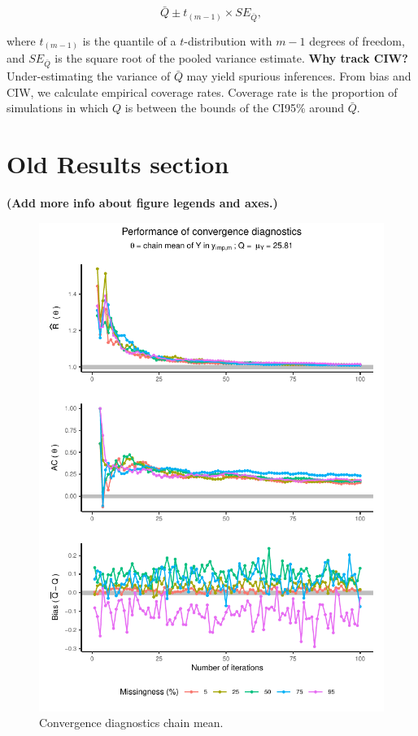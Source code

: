 \documentclass[Royal,times,sageh]{sagej}
\begin{document}
\[\bar{Q} \pm t_{(m-1)} \times SE_{\bar{Q}},\]

where \(t_{(m-1)}\) is the quantile of a \(t\)-distribution with \(m-1\)
degrees of freedom, and \(SE_{\bar{Q}}\) is the square root of the
pooled variance estimate. \textbf{Why track CIW?} Under-estimating the
variance of \(\bar{Q}\) may yield spurious inferences. From bias and
CIW, we calculate empirical coverage rates. Coverage rate is the
proportion of simulations in which \(Q\) is between the bounds of the
CI95\% around \(\bar{Q}\).

\hypertarget{old-results-section}{%
\section{Old Results section}\label{old-results-section}}

\textbf{(Add more info about figure legends and axes.)}

\begin{figure}

{\centering \includegraphics{manuscript_files/figure-latex/mean-1} 

}

\caption{Convergence diagnostics chain mean.}\label{fig:mean}
\end{figure}
\end{document}

